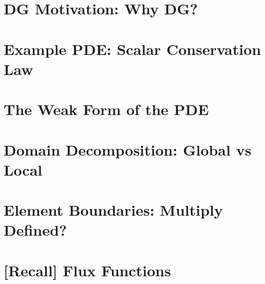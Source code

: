 \documentclass{beamer}
\begin{document}
\section{DG Motivation: Why DG?} 
\frame{\frametitle{\secname}
\begin{itemize}
\item 
\item 
\item 
\end{itemize} 
}

\section{Example PDE: Scalar Conservation Law} 
\frame{\frametitle{\secname}
\begin{itemize}
\item 
\item 
\item 
\end{itemize} 
}

\section{The Weak Form of the PDE} 
\frame{\frametitle{\secname}

}

\section{Domain Decomposition: Global vs Local} 
\frame{\frametitle{\secname}

}

\section{Element Boundaries: Multiply Defined?} 
\frame{\frametitle{\secname}

}

\section{[Recall] Flux Functions} 
\frame{\frametitle{\secname}

}
\end{document}
